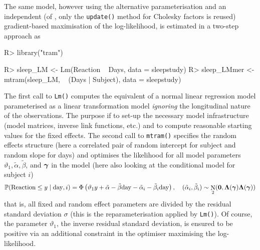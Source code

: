 \documentclass[article,nojss,shortnames]{jss}\usepackage[]{graphicx}\usepackage[]{xcolor}
\newcommand{\cmd}[1]{\texttt{#1()}}
\newcommand{\ry}{y}
\newcommand{\eparm}{\vartheta}
\newcommand{\varparm}{\gammavec}
\renewcommand{\Prob}{\mathbb{P}}
\DeclareMathOperator{\ND}{N}
\def \gammavec        {\text{\boldmath$\gamma$}}
\def \mLambda  {\mathbf{\Lambda}}
\def \nullvec {\mathbf{0}}
\begin{document}
The same model, however using the alternative parameterisation and an
independent (of , only the \cmd{update} method for Cholesky
factors is reused) gradient-based maximisation of the log-likelihood, is estimated 
in a two-step approach as
\begin{Schunk}
\begin{Sinput}
R> library("tram")
\end{Sinput}
\end{Schunk}
\begin{Schunk}
\begin{Sinput}
R> sleep_LM <- Lm(Reaction ~ Days, data = sleepstudy)
R> sleep_LMmer <- mtram(sleep_LM, ~ (Days | Subject), data = sleepstudy)
\end{Sinput}
\end{Schunk}
%
The first call to \cmd{Lm} computes the equivalent of a normal linear
regression model parameterised as a linear transformation model
\emph{ignoring} the longitudinal nature of the observations. The purpose if
to set-up the necessary model infrastructure (model matrices, inverse link
functions, etc.) and to compute reasonable starting values for the fixed
effects. The second call to \cmd{mtram} specifies the random effects
structure (here a correlated pair of random intercept for subject 
and random slope for days) and optimises the likelihood for all model
parameters $\eparm_1, \tilde{\alpha}, \tilde{\beta}$, and $\varparm$
in the model (here also looking at the conditional model for subject $i$)
%
\begin{eqnarray*}
\Prob(\text{Reaction} \le \ry \mid \text{day}, i) = \Phi\left(\eparm_1 \ry + \tilde{\alpha} - \tilde{\beta} \text{day} - \tilde{\alpha}_i - \tilde{\beta}_i \text{day}\right),
\quad (\tilde{\alpha}_i, \tilde{\beta}_i) \sim \ND_2(\nullvec, \mLambda(\varparm) \mLambda(\varparm))
\end{eqnarray*}
%
that is, all fixed and random effect parameters are 
divided by the residual standard deviation $\sigma$ (this is the
reparameterisation applied by \cmd{Lm}).
Of course, the parameter $\eparm_1$, the inverse residual standard
deviation, is ensured to be positive via an additional constraint in the
optimiser maximising the log-likelihood.
%
\end{document}
